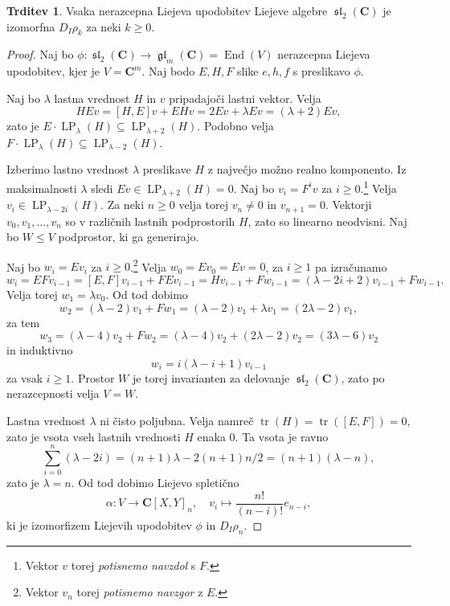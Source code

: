 \documentclass[11pt]{book}
\def\CC{\mathbf{C}}
\DeclareMathOperator\tr{tr}
\DeclareMathOperator\Eigenspace{LP}
\DeclareMathOperator\glfrak{\mathfrak{gl}}
\DeclareMathOperator\slfrak{\mathfrak{sl}}
\DeclareMathOperator\End{End}
\theoremstyle{definition}
\theoremstyle{zgled}
\theoremstyle{zgledbrezstevilke}
\theoremstyle{odprtproblem}
\theoremstyle{domacanaloga}
\newenvironment{dokaz}
    {\color{siva}\begin{proof}}
    {\end{proof}}
\theoremstyle{izrek}
\newtheorem{trditev}[theorem]{Trditev}
\begin{document}
\begin{trditev}
Vsaka nerazcepna Liejeva upodobitev Liejeve algebre $\slfrak_2(\CC)$ je izomorfna $D_I \rho_k$ za neki $k \geq 0$.
\end{trditev}
\begin{dokaz}
Naj bo $\phi \colon \slfrak_2(\CC) \to \glfrak_m(\CC) = \End(V)$ nerazcepna Liejeva upodobitev, kjer je $V = \CC^m$. Naj bodo $E,H,F$ slike $e,h,f$ s preslikavo $\phi$.

Naj bo $\lambda$ lastna vrednost $H$ in $v$ pripadajoči lastni vektor. Velja
\[
    HEv = [H,E]v + EHv = 2 E v + \lambda E v = (\lambda + 2) Ev,
\]
zato je $E \cdot \Eigenspace_{\lambda}(H) \subseteq \Eigenspace_{\lambda + 2}(H)$. Podobno velja $F \cdot \Eigenspace_{\lambda}(H) \subseteq \Eigenspace_{\lambda - 2}(H)$. 

Izberimo lastno vrednost $\lambda$ preslikave $H$ z največjo možno realno komponento.
Iz maksimalnosti $\lambda$ sledi $Ev \in \Eigenspace_{\lambda + 2}(H) = 0$. Naj bo $v_i = F^i v$ za $i \geq 0$.\footnote{Vektor $v$ torej \emph{potisnemo navzdol} s $F$.} Velja $v_i \in \Eigenspace_{\lambda - 2i}(H)$. Za neki $n \geq 0$ velja torej $v_n \neq 0$ in $v_{n+1} = 0$. Vektorji $v_0, v_1, \dots, v_n$ so v različnih lastnih podprostorih $H$, zato so linearno neodvisni. Naj bo $W \leq V$ podprostor, ki ga generirajo.

Naj bo $w_i = E v_i$ za $i \geq 0$.\footnote{Vektor $v_n$ torej \emph{potisnemo navzgor} z $E$.} Velja $w_0 = E v_0 = Ev = 0$, za $i \geq 1$ pa izračunamo
\[
    w_i 
    = E F v_{i-1}
    = [E,F] v_{i-1} + FE v_{i-1}
    = H v_{i-1} + F w_{i-1}
    = (\lambda - 2i + 2) v_{i-1} + F w_{i-1}.
\]
Velja torej $w_1 = \lambda v_0$. Od tod dobimo
\[
    w_2 = (\lambda - 2) v_1 + F w_1
    = (\lambda - 2) v_1 + \lambda v_1
    = (2 \lambda - 2) v_1,
\]
za tem
\[
    w_3 = (\lambda - 4) v_2 + F w_2
    = (\lambda - 4) v_2 + (2\lambda - 2) v_2
    = (3 \lambda - 6) v_2
\]
in induktivno
\[
    w_i = i (\lambda - i + 1) v_{i-1}
\]
za vsak $i \geq 1$. Prostor $W$ je torej invarianten za delovanje $\slfrak_2(\CC)$, zato po nerazcepnosti velja $V = W$.

Lastna vrednost $\lambda$ ni čisto poljubna. Velja namreč $\tr(H) = \tr([E,F]) = 0$, zato je vsota vseh lastnih vrednosti $H$ enaka $0$. Ta vsota je ravno
\[
    \sum_{i = 0}^n (\lambda - 2i) = (n+1) \lambda - 2 (n+1)n/2
    = (n+1)(\lambda - n),
\]
zato je $\lambda = n$. Od tod dobimo Liejevo spletično
\[
    \alpha \colon V \to \CC[X,Y]_n, \quad
    v_i \mapsto \frac{n!}{(n-i)!} e_{n-i},
\]
ki je izomorfizem Liejevih upodobitev $\phi$ in $D_I \rho_n$.
\end{dokaz}
\end{document}
